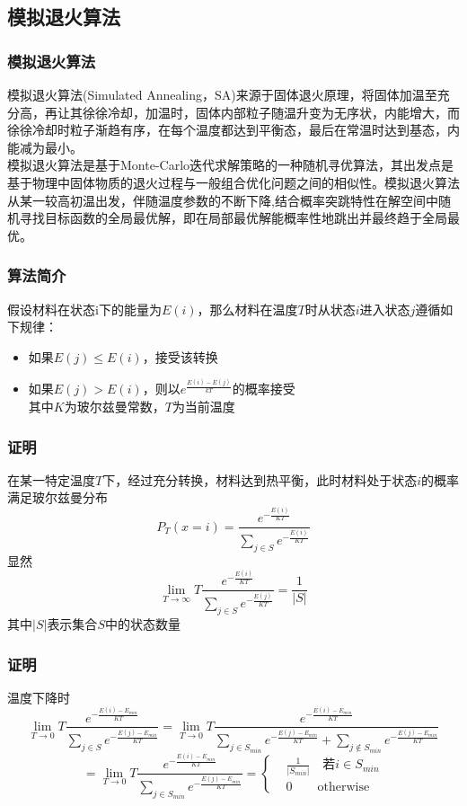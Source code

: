 \documentclass{beamer}
\begin{document}
\begin{spacing}{1.5}
	\section{模拟退火算法}
	\begin{frame}\footnotesize
		\frametitle{模拟退火算法}
		模拟退火算法(Simulated Annealing，SA)来源于固体退火原理，将固体加温至充分高，再让其徐徐冷却，加温时，固体内部粒子随温升变为无序状，内能增大，而徐徐冷却时粒子渐趋有序，在每个温度都达到平衡态，最后在常温时达到基态，内能减为最小。 \\
模拟退火算法是基于Monte-Carlo迭代求解策略的一种随机寻优算法，其出发点是基于物理中固体物质的退火过程与一般组合优化问题之间的相似性。模拟退火算法从某一较高初温出发，伴随温度参数的不断下降,结合概率突跳特性在解空间中随机寻找目标函数的全局最优解，即在局部最优解能概率性地跳出并最终趋于全局最优。
	\end{frame}
	\begin{frame}\footnotesize
		\frametitle{算法简介}
			假设材料在状态i下的能量为$E(i)$，那么材料在温度$T$时从状态$i$进入状态$j$遵循如下规律：
			\begin{itemize}
				\item	如果$E(j) \leq E(i)$，接受该转换
				\item	如果$E(j) > E(i)$，则以$e^{\frac{E(i) - E(j)}{kT}}$的概率接受\\其中$K$为玻尔兹曼常数，$T$为当前温度
			\end{itemize}
	\end{frame}
	\begin{frame}\footnotesize
		\frametitle{证明}
			在某一特定温度$T$下，经过充分转换，材料达到热平衡，此时材料处于状态$i$的概率满足玻尔兹曼分布
			$$P_{T}(x = i) = \frac{e^{-\frac{E(i)}{KT}}}{\sum\limits_{j \in S} e^{-\frac{E(i)}{KT}}}$$
			显然
			$$\lim_{T\to\infty}{T}\frac{e^{-\frac{E(i)}{KT}}}{\sum\limits_{j \in S} e^{-\frac{E(j)}{KT}}} = \frac{1}{|S|}$$
			其中$|S|$表示集合$S$中的状态数量
	\end{frame}
	\begin{frame}\footnotesize
		\frametitle{证明}
			温度下降时
			$$\lim_{T\to 0}{T}\frac{e^{-\frac{E(i) - E_{min}}{KT}}}{\sum\limits_{j \in S} e^{-\frac{E(j) - E_{min}}{KT}}} = \lim_{T\to 0}{T}\frac{e^{-\frac{E(i) - E_{min}}{KT}}}{\sum\limits_{j \in S_{min}} e^{-\frac{E(j) - E_{min}}{KT}} + \sum\limits_{j \not\in S_{min}} e^{-\frac{E(j) - E_{min}}{KT}}}$$
			$$ = \lim_{T\to 0}{T}\frac{e^{-\frac{E(i) - E_{min}}{KT}}}{\sum\limits_{j \in S_{min}} e^{-\frac{E(j) - E_{min}}{KT}}} = 
			\left\{
				\begin{aligned}
				&\frac{1}{|S_{min}|}\quad \text{若}i \in S_{min}\\
				&0	\qquad \text{otherwise}
				\end{aligned}
			\right.$$
			


\end{frame}
\end{spacing}
\end{document}
